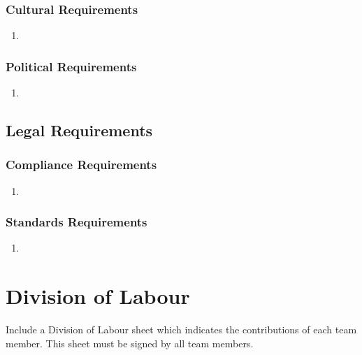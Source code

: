 \documentclass[]{article}
\begin{document}
\subsubsection{Cultural Requirements}
\label{ssub:cultural_requirements}
\begin{enumerate}[label={CP-C\arabic*.}]
    \item 
\end{enumerate}

\subsubsection{Political Requirements}
\label{ssub:political_requirements}
\begin{enumerate}[label={CP-P\arabic*.}]
    \item 
\end{enumerate}


\subsection{Legal Requirements}
\label{sub:legal_requirements}

\subsubsection{Compliance Requirements}
\label{ssub:compliance_requirements}
\begin{enumerate}[label={LR-COMP\arabic*.}]
    \item 
\end{enumerate}

\subsubsection{Standards Requirements}
\label{ssub:standards_requirements}
\begin{enumerate}[label={LR-STD\arabic*.}]
    \item 
\end{enumerate}


\appendix
\section{Division of Labour}
\label{sec:division_of_labour}
Include a Division of Labour sheet which indicates the contributions of each team member. This sheet must be signed by all team members.
\end{document}
